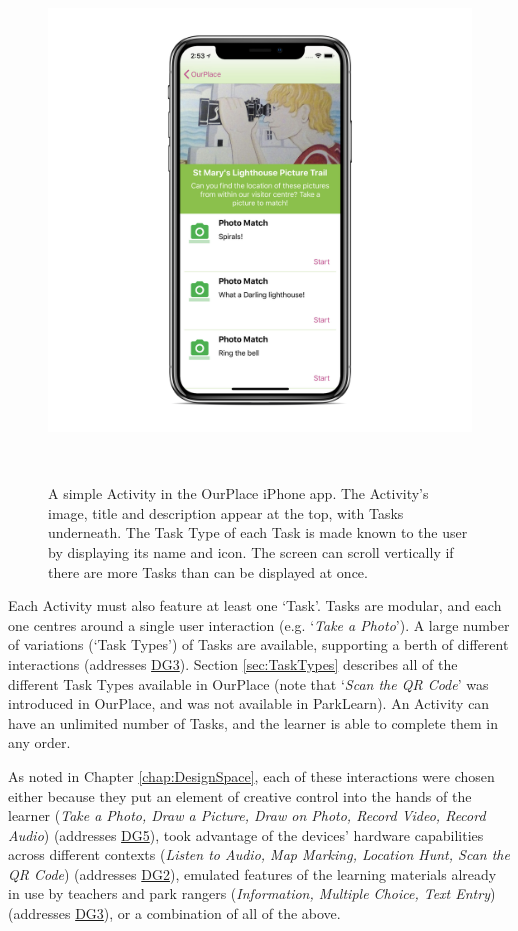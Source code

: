 \begin{figure}
  \centering
  \includegraphics[width=0.85\columnwidth]{images/chapter05/activity.png}
  \caption[A simple OurPlace Activity]{ A simple Activity in the OurPlace iPhone app. The Activity's image, title and description appear at the top, with Tasks underneath. The Task Type of each Task is made known to the user by displaying its name and icon. The screen can scroll vertically if there are more Tasks than can be displayed at once. }~\label{fig:ActivityExample}
\end{figure}

Each Activity must also feature at least one `Task'. Tasks are modular, and each one centres around a single user interaction (e.g. `\textit{Take a Photo}'). A large number of variations (`Task Types') of Tasks are available, supporting a berth of different interactions (addresses \hyperref[DG3]{DG3}). Section \ref{sec:TaskTypes} describes all of the different Task Types available in OurPlace (note that `\textit{Scan the QR Code}' was introduced in OurPlace, and was not available in ParkLearn). An Activity can have an unlimited number of Tasks, and the learner is able to complete them in any order.

As noted in Chapter \ref{chap:DesignSpace}, each of these interactions were chosen either because they put an element of creative control into the hands of the learner (\textit{Take a Photo, Draw a Picture, Draw on Photo, Record Video, Record Audio}) (addresses \hyperref[DG5]{DG5}), took advantage of the devices’ hardware capabilities across different contexts (\textit{Listen to Audio, Map Marking, Location Hunt, Scan the QR Code}) (addresses \hyperref[DG2]{DG2}), emulated features of the learning materials already in use by teachers and park rangers (\textit{Information, Multiple Choice, Text Entry}) (addresses \hyperref[DG3]{DG3}), or a combination of all of the above.

